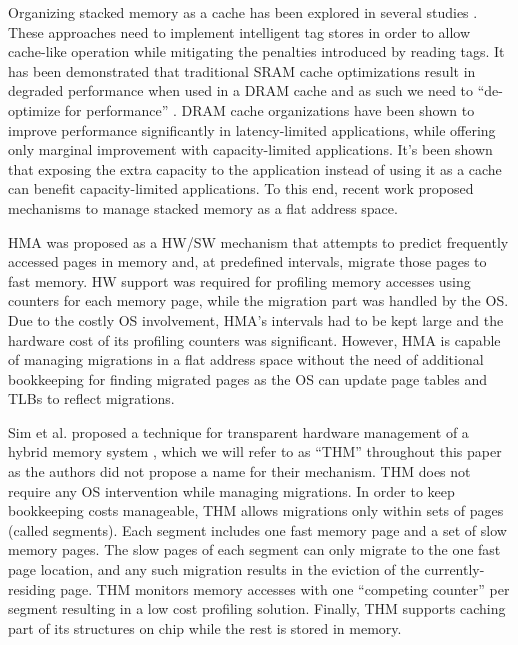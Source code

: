 Organizing stacked memory as a cache has been explored in several studies \cite{qureshi-micro2012,BEAR,BIMODAL,citadel,tagless-dram-cache,UNISON}. These approaches need to implement intelligent tag stores in order to allow cache-like operation while mitigating the penalties introduced by reading tags. It has been demonstrated that traditional SRAM cache optimizations result in degraded performance when used in a DRAM cache and as such we need to ``de-optimize for performance'' \cite{qureshi-micro2012}. DRAM cache organizations have been shown to improve performance significantly in latency-limited applications, while offering only marginal improvement with capacity-limited applications. It's been shown that exposing the extra capacity to the application instead of using it as a cache can benefit capacity-limited applications. To this end, recent work \cite{meswani-HPCA21,sim-micro2014,cameo} proposed mechanisms to manage stacked memory as a flat address space. 

HMA \cite{meswani-HPCA21} was proposed as a HW/SW mechanism that attempts to predict frequently accessed pages in memory and, at predefined intervals, migrate those pages to fast memory. HW support was required for profiling memory accesses using counters for each memory page, while the migration part was handled by the OS. Due to the costly OS involvement, HMA's intervals had to be kept large and the hardware cost of its profiling counters was significant. However, HMA is capable of managing migrations in a flat address space without the need of additional bookkeeping for finding migrated pages as the OS can update page tables and TLBs to reflect migrations.

Sim et al. proposed a technique for transparent hardware management of a hybrid memory system \cite{sim-micro2014}, which we will refer to as ``THM'' throughout this paper as the authors did not propose a name for their mechanism. THM does not require any OS intervention while managing migrations. In order to keep bookkeeping costs manageable, THM allows migrations only within sets of pages (called segments). Each segment includes one fast memory page and a set of slow memory pages. The slow pages of each segment can only migrate to the one fast page location, and any such migration results in the eviction of the currently-residing page. THM monitors memory accesses with one ``competing counter'' per segment resulting in a low cost profiling solution. Finally, THM supports caching part of its structures on chip while the rest is stored in memory.

